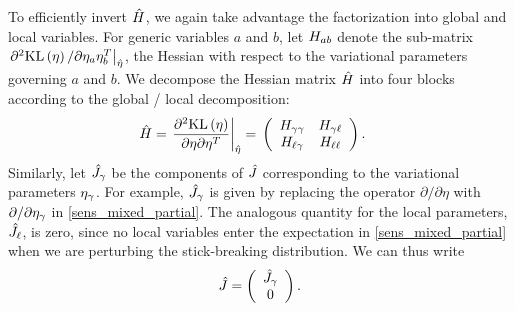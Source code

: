 To efficiently invert $\hat{H}$, we again take advantage the factorization into
global and local variables. For generic variables $a$ and $b$, let
$H_{ab}$ denote the sub-matrix $\left.\partial^2 \mathrm{KL}\left(\eta\right) / \partial
\eta_a \eta_b^T\right|_{\hat\eta}$, the Hessian with respect to the variational
parameters governing $a$ and $b$. We decompose the Hessian matrix $\hat{H}$
into four blocks according to the global / local decomposition:
%
\begin{align*}
%
\hessopt =
\fracat{\partial^2 \KL{\eta}}
       {\partial \eta \partial \eta^T}
       {\etaopt} ={}&
\left(
\begin{array}{cc}
   \hess{\gamma\gamma} & \hess{\gamma\ell} \\
   \hess{\ell\gamma}     & \hess{\ell\ell} \\
\end{array}
\right).
%
\end{align*}
%
Similarly, let $\hat J_\gamma$ be the components of $\hat J$
corresponding to the variational parameters $\eta_{\gamma}$.  For example,
$\hat J_\gamma$ is given by replacing the operator $\partial / \partial
\eta$ with $\partial / \partial \eta_{\gamma}$ in \eqref{sens_mixed_partial}. The
analogous quantity for the local parameters, $\hat J_\ell$, is zero,
since no local variables enter the expectation in \eqref{sens_mixed_partial}
when we are perturbing the stick-breaking distribution.
%
We can thus write
\begin{align*}
  \hat J = \left( \begin{array}{c} \hat J_\gamma \\ 0 \end{array}\right).
\end{align*}

